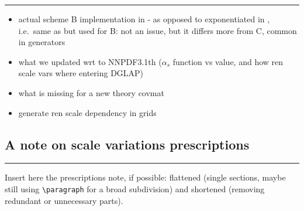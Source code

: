 \vspace*{20pt}
\noindent
\rule{\hsize}{1pt}

\begin{itemize}
	\item actual scheme B implementation in \eko - as opposed to exponentiated
		in \apfel, i.e.\ same as \pegasus but used for B: not an issue, but it
		differs more from C, common in \mc generators
	\item what we updated wrt to NNPDF3.1th ($\alpha_s$ function vs value, and
		how ren scale vars where entering DGLAP)
	\item what is missing for a new theory covmat
	\item generate ren scale dependency in grids
\end{itemize}

\subsection{A note on scale variations prescriptions}
\label{sec:pine/mhou-scvar-note}

\vspace*{20pt}
\noindent
\rule{\hsize}{1pt}

Insert here the prescriptions note, if possible: flattened (single sections,
maybe still using \lstinline{\paragraph} for a broad subdivision) and shortened
(removing redundant or unnecessary parts).
